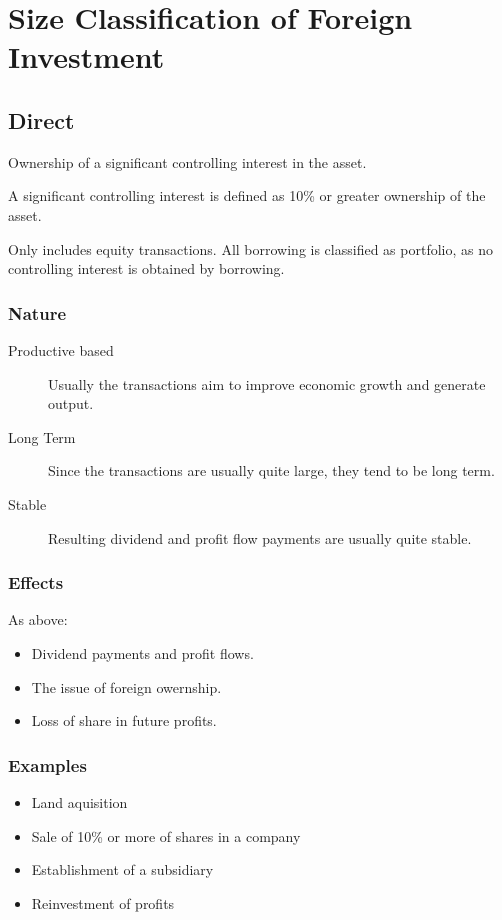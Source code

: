 \documentclass[a4paper,11pt]{article}
\begin{document}
\section{Size Classification of Foreign Investment}

\subsection{Direct}

Ownership of a significant controlling interest in the asset.

A significant controlling interest is defined as 10\% or greater ownership of
the asset.

Only includes equity transactions. All borrowing is classified as portfolio, as
no controlling interest is obtained by borrowing.


\subsubsection{Nature}

\begin{description}
\item [Productive based] Usually the transactions aim to improve economic
	growth and generate output.
\item [Long Term] Since the transactions are usually quite large, they tend to
	be long term.
\item [Stable] Resulting dividend and profit flow payments are usually quite
	stable.
\end{description}


\subsubsection{Effects}

As above:

\begin{itemize}
\item Dividend payments and profit flows.
\item The issue of foreign owernship.
\item Loss of share in future profits.
\end{itemize}


\subsubsection{Examples}

\begin{itemize}
\item Land aquisition
\item Sale of 10\% or more of shares in a company
\item Establishment of a subsidiary
\item Reinvestment of profits
\end{itemize}
\end{document}
